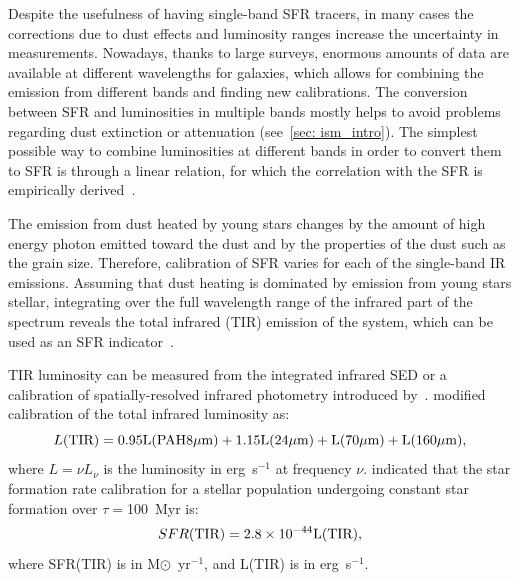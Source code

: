 Despite the usefulness of having single-band SFR tracers, in many cases the corrections due to dust effects and luminosity ranges increase the uncertainty in measurements.
Nowadays, thanks to large surveys, enormous amounts of data are available at different wavelengths for galaxies, which allows for combining the emission from different bands and finding new calibrations.
The conversion between SFR and luminosities in multiple bands mostly helps to avoid problems regarding dust extinction or attenuation (see~\ref{sec: ism_intro}). 
The simplest possible way to combine luminosities at different bands in order to convert them to SFR is through a linear relation, for which the correlation with the SFR is empirically derived~\citep{Kennicutt12}.

The emission from dust heated by young stars changes by the amount of high energy photon emitted toward the dust and by the properties of the dust such as the grain size.
Therefore, calibration of SFR varies for each of the single-band IR emissions.
Assuming that dust heating is dominated by emission from young stars stellar, integrating over the full wavelength range of the infrared part of the spectrum reveals the total infrared (TIR) emission of the system, which can be used as an SFR indicator~\citep{Kennicutt98b}. 
 
TIR luminosity can be measured from the integrated infrared SED or a calibration of spatially-resolved infrared photometry introduced by~\cite{Draine07}. 
\cite{Boquien10} modified calibration of the total infrared luminosity as: 
\begin{equation}
L(\rm TIR) = 0.95L(PAH 8 \mu m) + 1.15L(24 \mu m) + L(70 \mu m) + L(160 \mu m),
\end{equation}
where $L = \nu L_{\nu}$ is the luminosity in erg~s$^{-1}$ at frequency $\nu$. 
\cite{Calzetti07} indicated that the star formation rate calibration for a stellar population undergoing constant star formation over $\tau=$100~Myr is:
\begin{equation}
\label{sfr_tot_IR}
SFR(\rm TIR) = 2.8 \times10^{-44}L(\rm TIR),
\end{equation}
where SFR(TIR) is in M${\odot}$~yr$^{-1}$, and L(TIR) is in erg~s$^{-1}$. 


